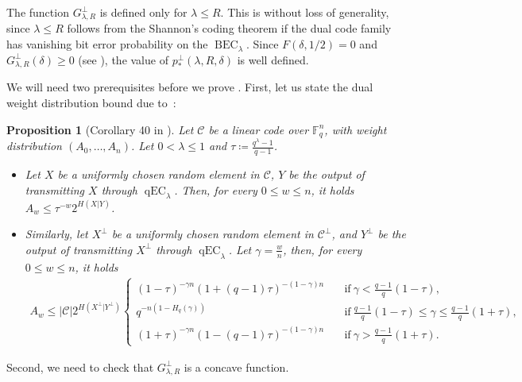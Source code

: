 \documentclass{article}
\DeclareMathOperator{\qEC}{qEC}
\DeclareMathOperator{\BEC}{BEC}
\newcommand{\cC}{\mathcal{C}}
\theoremstyle{plain}
\theoremstyle{plain}
\theoremstyle{plain}
\theoremstyle{plain}
\theoremstyle{plain}
\newtheorem{proposition}[definition]{Proposition}%
\theoremstyle{plain}
\theoremstyle{plain}
\theoremstyle{plain}
\theoremstyle{plain}
\theoremstyle{plain}
\theoremstyle{remark}
\theoremstyle{remark}
\theoremstyle{remark}
\theoremstyle{plain}
\begin{document}
The function $G^\perp_{\lambda,R}$ is defined
only  for $\lambda\le R$. This is without
loss of generality, since $\lambda\le R$
follows from the Shannon's coding theorem
if the dual code family 
has vanishing bit error probability
on the $\BEC_\lambda$.
Since $F(\delta,1/2)=0$
and $G_{\lambda,R}^\perp(\delta)\ge 0$
(see ), the
value of $p^\perp_*(\lambda,R,\delta)$ is well defined.

We will need two prerequisites before we
prove . First,
let us state the dual weight distribution
bound due to~\cite{samorodnitsky2019upper}:
\begin{proposition}[Corollary 40 in \cite{abawonse2025generalized}]
\label{lem:qary_Sam}
    Let $\cC$ be a linear code over $\mathbb{F}_q^{n}$, with weight distribution $(A_0,\ldots,A_n)$. Let $0<\lambda\le 1$ and $\tau\coloneqq \frac{q^\lambda-1}{q-1}$.
    \begin{itemize}
        \item[1)] Let $X$ be a uniformly chosen random element in $\cC$, $Y$ be the output of transmitting $X$ through $\qEC_\lambda$. Then, for every $0\le w\le n$, it holds $A_w\le \tau^{-w} 2^{H(X|Y)}$.
        \item[2)] Similarly, let $X^{\perp}$ be a uniformly chosen random element in $\cC^{\perp}$, and $Y^{\perp}$ be the output of transmitting $X^{\perp}$ through $\qEC_\lambda$. Let $\gamma=\frac{w}{n}$, then, for every $0\le w\le n$, it holds
        \begin{align*}
            A_w\le|\cC|2^{H(X^{\perp}|Y^{\perp})}\begin{cases}(1-\tau)^{-\gamma n}(1+(q-1)\tau)^{-(1-\gamma)n}&\quad\text{if}\ \gamma<\frac{q-1}{q}(1-\tau),\\ q^{-n(1-H_q(\gamma))}&\quad\text{if}\ \frac{q-1}{q}(1-\tau)\le \gamma\le \frac{q-1}{q}(1+\tau),
            \\
            (1+\tau)^{-\gamma n}
            (1-(q-1)\tau)^{-(1-\gamma)n}&\quad\text{if}\ \gamma>\frac{q-1}{q}(1+\tau). \end{cases} 
        \end{align*}
        \end{itemize}
\end{proposition}

Second, we need to check that 
$G^\perp_{\lambda,R}$ is a concave function.
\end{document}
